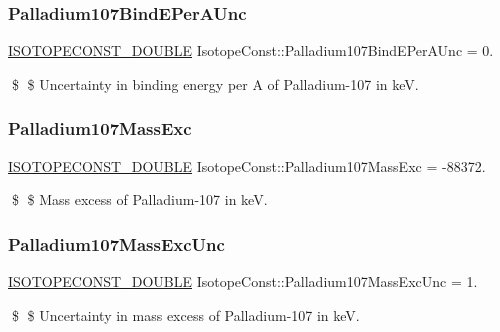 \subsubsection{\texorpdfstring{Palladium107\+Bind\+E\+Per\+A\+Unc}{Palladium107BindEPerAUnc}}
{\footnotesize\ttfamily \mbox{\hyperlink{group___isotope_const-_macros_ga8f45a7272ce02c0b4c65c44636ed719a}{I\+S\+O\+T\+O\+P\+E\+C\+O\+N\+S\+T\+\_\+\+D\+O\+U\+B\+LE}} Isotope\+Const\+::\+Palladium107\+Bind\+E\+Per\+A\+Unc = 0.}

\$ \$ Uncertainty in binding energy per A of Palladium-\/107 in keV. \mbox{\label{group___isotope_const-_palladium-_pd107_gadbb9b7a5b281893ff14ce07ea8547e81}} 
\subsubsection{\texorpdfstring{Palladium107\+Mass\+Exc}{Palladium107MassExc}}
{\footnotesize\ttfamily \mbox{\hyperlink{group___isotope_const-_macros_ga8f45a7272ce02c0b4c65c44636ed719a}{I\+S\+O\+T\+O\+P\+E\+C\+O\+N\+S\+T\+\_\+\+D\+O\+U\+B\+LE}} Isotope\+Const\+::\+Palladium107\+Mass\+Exc = -\/88372.}

\$ \$ Mass excess of Palladium-\/107 in keV. \mbox{\label{group___isotope_const-_palladium-_pd107_gaf78483d0378736f4c9039207202fba18}} 
\subsubsection{\texorpdfstring{Palladium107\+Mass\+Exc\+Unc}{Palladium107MassExcUnc}}
{\footnotesize\ttfamily \mbox{\hyperlink{group___isotope_const-_macros_ga8f45a7272ce02c0b4c65c44636ed719a}{I\+S\+O\+T\+O\+P\+E\+C\+O\+N\+S\+T\+\_\+\+D\+O\+U\+B\+LE}} Isotope\+Const\+::\+Palladium107\+Mass\+Exc\+Unc = 1.}

\$ \$ Uncertainty in mass excess of Palladium-\/107 in keV. \mbox{\label{group___isotope_const-_palladium-_pd107_ga9bd4b33232c348ff9d4516d6ed833c67}} 
